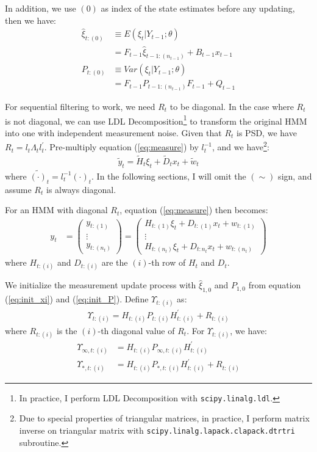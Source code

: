 \documentclass[10pt]{article}
\numberwithin{equation}{section}
\begin{document}
In addition, we use $(0)$ as index of the state estimates before any updating, then we have:
\begin{align}
    \hat{\xi}_{t:(0)} &\equiv E(\xi_{t}|Y_{t-1};\theta)\nonumber \\
    &= F_{t-1}\hat{\xi}_{t-1:(n_{t-1})}+B_{t-1}x_{t-1} \label{eq:diff_xi_seq0} \\
    P_{t:(0)} &\equiv Var(\xi_{t}|Y_{t-1};\theta) \nonumber \\
    &= F_{t-1}P_{t-1:(n_{t-1})}F_{t-1} + Q_{t-1} \label{eq:diff_P_seq0}
\end{align}

For sequential filtering to work, we need $R_t$ to be diagonal. In the case where $R_t$ is not diagonal, we can use LDL Decomposition\footnote{In practice, I perform LDL Decomposition with \texttt{scipy.linalg.ldl}.} to transform the original HMM into one with independent measurement noise. Given that $R_t$ is PSD, we have $R_t = l_t\Lambda_tl_t^{'}$. Pre-multiply equation (\ref{eq:measure}) by $l_t^{-1}$, and we have\footnote{Due to special properties of triangular matrices, in practice, I perform matrix inverse on triangular matrix with \texttt{scipy.linalg.lapack.clapack.dtrtri} subroutine.}:
\begin{align}
    \tilde{y}_t = \tilde{H}_t\xi_{t} + \tilde{D}_{t}x_t + \tilde{w}_t \label{eq:ldl}
\end{align}
where $\tilde{(\cdot)}_t = l_t^{-1}(\cdot)_t$. In the following sections, I will omit the $(\sim)$ sign, and assume $R_t$ is always diagonal.

For an HMM with diagonal $R_t$, equation (\ref{eq:measure}) then becomes:
\begin{align*}
    y_t &= 
    \begin{pmatrix}
        y_{t:(1)} \\
        \vdots \\ 
        y_{t:(n_t)}
    \end{pmatrix} 
    = \begin{pmatrix}
        H_{t:(1)}\xi_t + D_{t:(1)}x_t + w_{t:(1)} \\
        \vdots \\
        H_{t:(n_t)}\xi_t + D_{t:n_t}x_t + w_{t:(n_t)}
    \end{pmatrix}
\end{align*}
where $H_{t:(i)}$ and $D_{t:(i)}$ are the $(i)$-th row of $H_t$ and $D_t$. 

We initialize the measurement update process with $\hat{\xi}_{1,0}$ and $P_{1,0}$ from equation (\ref{eq:init_xi}) and (\ref{eq:init_P}). Define $\Upsilon_{t:(i)}$ as:
\begin{align*}
    \Upsilon_{t:(i)} = H_{t:(i)}P_{t:(i)}H_{t:(i)}^{'} + R_{t:(i)}
\end{align*}
where $R_{t:(i)}$ is the $(i)$-th diagonal value of $R_{t}$. For $\Upsilon_{t:(i)}$, we have:
\begin{align*}
    \Upsilon_{\infty, t:(i)} &= H_{t:(i)}P_{\infty, t:(i)}H_{t:(i)}^{'} \\
    \Upsilon_{*,t:(i)} &= H_{t:(i)}P_{*,t:(i)}H_{t:(i)}^{'} + R_{t:(i)}
\end{align*}
\end{document}
